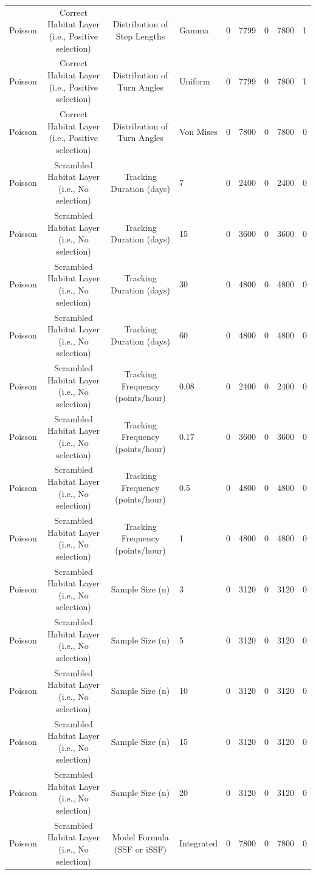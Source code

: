 \documentclass[10pt,a4paper]{article}
\begin{document}
\begin{table}
{\begin{tabular}[t]{lcclcclcc}
Poisson & Correct Habitat Layer (i.e., Positive selection) & Distribution of Step Lengths & Gamma & 0 & 7799 & 0 & 7800 & 1\\
Poisson & Correct Habitat Layer (i.e., Positive selection) & Distribution of Turn Angles & Uniform & 0 & 7799 & 0 & 7800 & 1\\
Poisson & Correct Habitat Layer (i.e., Positive selection) & Distribution of Turn Angles & Von Mises & 0 & 7800 & 0 & 7800 & 0\\
Poisson & Scrambled Habitat Layer (i.e., No selection) & Tracking Duration (days) & 7 & 0 & 2400 & 0 & 2400 & 0\\
Poisson & Scrambled Habitat Layer (i.e., No selection) & Tracking Duration (days) & 15 & 0 & 3600 & 0 & 3600 & 0\\
Poisson & Scrambled Habitat Layer (i.e., No selection) & Tracking Duration (days) & 30 & 0 & 4800 & 0 & 4800 & 0\\
Poisson & Scrambled Habitat Layer (i.e., No selection) & Tracking Duration (days) & 60 & 0 & 4800 & 0 & 4800 & 0\\
Poisson & Scrambled Habitat Layer (i.e., No selection) & Tracking Frequency (points/hour) & 0.08 & 0 & 2400 & 0 & 2400 & 0\\
Poisson & Scrambled Habitat Layer (i.e., No selection) & Tracking Frequency (points/hour) & 0.17 & 0 & 3600 & 0 & 3600 & 0\\
Poisson & Scrambled Habitat Layer (i.e., No selection) & Tracking Frequency (points/hour) & 0.5 & 0 & 4800 & 0 & 4800 & 0\\
Poisson & Scrambled Habitat Layer (i.e., No selection) & Tracking Frequency (points/hour) & 1 & 0 & 4800 & 0 & 4800 & 0\\
Poisson & Scrambled Habitat Layer (i.e., No selection) & Sample Size (n) & 3 & 0 & 3120 & 0 & 3120 & 0\\
Poisson & Scrambled Habitat Layer (i.e., No selection) & Sample Size (n) & 5 & 0 & 3120 & 0 & 3120 & 0\\
Poisson & Scrambled Habitat Layer (i.e., No selection) & Sample Size (n) & 10 & 0 & 3120 & 0 & 3120 & 0\\
Poisson & Scrambled Habitat Layer (i.e., No selection) & Sample Size (n) & 15 & 0 & 3120 & 0 & 3120 & 0\\
Poisson & Scrambled Habitat Layer (i.e., No selection) & Sample Size (n) & 20 & 0 & 3120 & 0 & 3120 & 0\\
Poisson & Scrambled Habitat Layer (i.e., No selection) & Model Formula (SSF or iSSF) & Integrated & 0 & 7800 & 0 & 7800 & 0\\

\end{tabular}}
\end{table}
\end{document}
